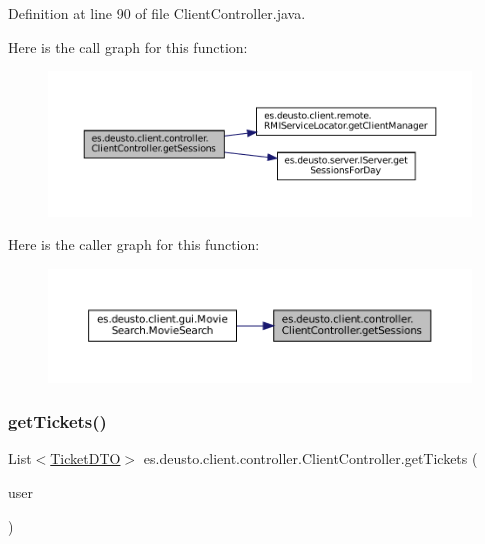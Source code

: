 Definition at line 90 of file Client\+Controller.\+java.

Here is the call graph for this function\+:
\nopagebreak
\begin{figure}[H]
\begin{center}
\leavevmode
\includegraphics[width=350pt]{classes_1_1deusto_1_1client_1_1controller_1_1_client_controller_a06a84e0834fb21c31f4988e26ee6dedf_cgraph}
\end{center}
\end{figure}
Here is the caller graph for this function\+:
\nopagebreak
\begin{figure}[H]
\begin{center}
\leavevmode
\includegraphics[width=350pt]{classes_1_1deusto_1_1client_1_1controller_1_1_client_controller_a06a84e0834fb21c31f4988e26ee6dedf_icgraph}
\end{center}
\end{figure}
\mbox{\label{classes_1_1deusto_1_1client_1_1controller_1_1_client_controller_a672fc1afb95f03c33cd659345fe1ca71}} 
\subsubsection{\texorpdfstring{getTickets()}{getTickets()}}
{\footnotesize\ttfamily List$<$\mbox{\hyperlink{classes_1_1deusto_1_1server_1_1data_1_1_ticket_d_t_o}{Ticket\+D\+TO}}$>$ es.\+deusto.\+client.\+controller.\+Client\+Controller.\+get\+Tickets (\begin{DoxyParamCaption}\item[{\mbox{\hyperlink{classes_1_1deusto_1_1server_1_1data_1_1_user_d_t_o}{User\+D\+TO}}}]{user }\end{DoxyParamCaption})}




